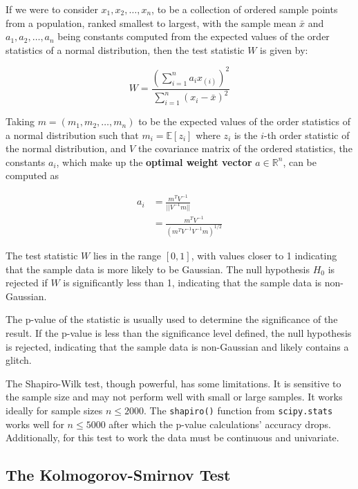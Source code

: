 \documentclass[12pt]{article}
\begin{document}
\medskip
\noindent If we were to consider $x_1, x_2, \ldots, x_n$, to be a collection of ordered sample points from a population, ranked smallest to largest, with the sample mean $\bar{x}$ and $a_1, a_2, \ldots, a_n$ being constants computed from the expected values of the order statistics of a normal distribution, then the test statistic $W$ is given by:

\begin{equation}
    W = \frac{(\sum\limits_{i=1}^{n} a_i x_{(i)})^2}{\sum\limits_{i=1}^{n} (x_i - \bar{x})^2}
    \label{eq:shapiro_wilk_statistic}
\end{equation}

\medskip
\noindent Taking $m = (m_1, m_2, \ldots, m_n)$ to be the expected values of the order statistics of a normal distribution such that $m_i = \mathbb{E}[z_i]$ where $z_i$ is the $i$-th order statistic of the normal distribution, and $V$ the covariance matrix of the ordered statistics, the constants $a_i$, which make up the \textbf{optimal weight vector} $a \in \mathbb{R}^n$, can be computed as

\begin{align}
    a_i &= \frac{m^T V^{-1}}{||V^{-1} m||} \\
        &= \frac{m^T V^{-1}}{(m^T V^{-1}V^{-1}m)^{1/2}}
    \label{eq:shapiro_wilk_constants}
\end{align}

\medskip
\noindent The test statistic $W$ lies in the range $[0, 1]$, with values closer to 1 indicating that the sample data is more likely to be Gaussian. The null hypothesis $H_0$ is rejected if $W$ is significantly less than 1, indicating that the sample data is non-Gaussian.

\medskip
\noindent The p-value of the statistic is usually used to determine the significance of the result. If the p-value is less than the significance level defined, the null hypothesis is rejected, indicating that the sample data is non-Gaussian and likely contains a glitch.

\medskip
\noindent The Shapiro-Wilk test, though powerful, has some limitations. It is sensitive to the sample size and may not perform well with small or large samples. It works ideally for sample sizes $n \leq 2000$. The \texttt{shapiro()} function from \texttt{scipy.stats} works well for $n \leq 5000$ after which the p-value calculations' accuracy drops. Additionally, for this test to work the data must be continuous and univariate.

\subsection{The Kolmogorov-Smirnov Test}\label{KolmogorovSmirnov}
\end{document}
